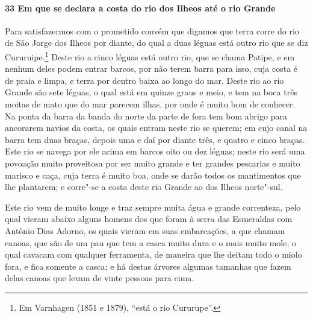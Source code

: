 \begin{linenumbers}
\paragraph{33 Em que se declara a costa do rio dos Ilheos até o rio Grande} \quad
Para satisfazermos com o prometido convém que digamos que terra corre do rio de São Jorge
dos Ilheos por diante, do qual a duas léguas está outro rio que se diz
Cururuipe.\footnote{ Em Varnhagen (1851 e 1879), ``está o rio Cururupe''.} Deste rio a
cinco léguas está outro rio, que se chama Patipe, e em nenhum deles podem entrar barcos,
por não terem barra para isso, cuja costa é de praia e limpa, e terra por dentro baixa ao
longo do mar. Deste rio ao rio Grande são sete léguas, o qual está em quinze graus e meio,
e tem na boca três moitas de mato que do mar parecem ilhas, por onde é muito bom de
conhecer. Na ponta da barra da banda do norte da parte de fora tem bom abrigo para
ancorarem navios da costa, os quais entram neste rio se querem; em cujo canal na barra tem
duas braças, depois uma e daí por diante três, e quatro e cinco braças. Este rio se navega
por ele acima em barcos oito ou dez léguas; neste rio será uma povoação muito proveitosa
por ser muito grande e ter grandes pescarias e muito marisco e caça, cuja terra é muito
boa, onde se darão todos os mantimentos que lhe plantarem; e corre"-se a costa deste rio
Grande ao dos Ilheos norte"-sul.

Este rio vem de muito longe e traz sempre muita água e grande correnteza, pelo qual vieram
abaixo alguns homens dos que foram à serra das Esmeraldas com Antônio Dias Adorno, os
quais vieram em suas embarcações, a que chamam canoas, que são de um pau que tem a casca
muito dura e o mais muito mole, o qual cavacam com qualquer ferramenta, de maneira que lhe
deitam todo o miolo fora, e fica somente a casca; e há destas árvores algumas tamanhas que
fazem delas canoas que levam de vinte pessoas para cima.


\end{linenumbers}
